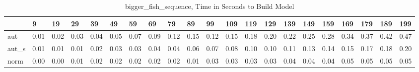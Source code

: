 \begin{table}
\caption{bigger_fish_sequence, Time in Seconds to Build Model}
\label{bigger_fish_sequence_model_time}
\begin{tabular}{lllllllllllllllllllll}
\toprule
 & 9 & 19 & 29 & 39 & 49 & 59 & 69 & 79 & 89 & 99 & 109 & 119 & 129 & 139 & 149 & 159 & 169 & 179 & 189 & 199 \\
\midrule
aut & 0.01 & 0.02 & 0.03 & 0.04 & 0.05 & 0.07 & 0.09 & 0.12 & 0.15 & 0.12 & 0.15 & 0.18 & 0.20 & 0.22 & 0.25 & 0.28 & 0.34 & 0.37 & 0.42 & 0.47 \\
aut_s & 0.01 & 0.01 & 0.01 & 0.02 & 0.03 & 0.03 & 0.04 & 0.04 & 0.06 & 0.07 & 0.08 & 0.10 & 0.10 & 0.11 & 0.13 & 0.14 & 0.15 & 0.17 & 0.18 & 0.20 \\
norm & 0.00 & 0.00 & 0.01 & 0.02 & 0.02 & 0.02 & 0.02 & 0.02 & 0.01 & 0.03 & 0.03 & 0.03 & 0.03 & 0.04 & 0.04 & 0.04 & 0.05 & 0.05 & 0.05 & 0.05 \\
\bottomrule
\end{tabular}
\end{table}

